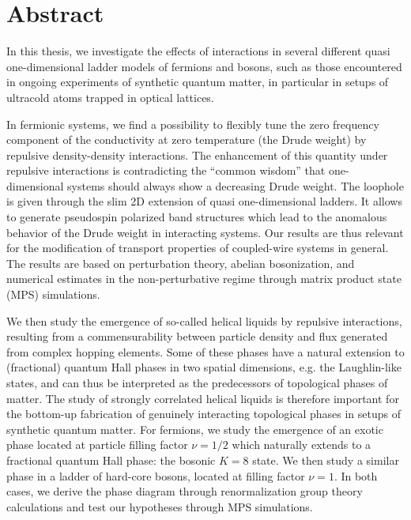 %
\chapter*{Abstract}
%
In this thesis, we investigate the effects of interactions in several different quasi one-dimensional ladder models of fermions and bosons, such as those encountered in ongoing experiments of synthetic quantum matter, in particular in setups of ultracold atoms trapped in optical lattices.

In fermionic systems, we find a possibility to flexibly tune the zero frequency component of the conductivity at zero temperature (the Drude weight) by repulsive density-density interactions.
The enhancement of this quantity under repulsive interactions is contradicting the ``common wisdom'' that one-dimensional systems should always show a decreasing Drude weight.
The loophole is given through the slim 2D extension of quasi one-dimensional ladders.
It allows to generate pseudospin polarized band structures which lead to the anomalous behavior of the Drude weight in interacting systems.
Our results are thus relevant for the modification of transport properties of coupled-wire systems in general.
The results are based on perturbation theory, abelian bosonization, and numerical estimates in the non-perturbative regime through matrix product state (MPS) simulations.

We then study the emergence of so-called helical liquids by repulsive interactions, resulting from a commensurability between particle density and flux generated from complex hopping elements.
Some of these phases have a natural extension to (fractional) quantum Hall phases in two spatial dimensions, e.g. the Laughlin-like states, and can thus be interpreted as the predecessors of topological phases of matter.
The study of strongly correlated helical liquids is therefore important for the bottom-up fabrication of genuinely interacting topological phases in setups of synthetic quantum matter.
For fermions, we study the emergence of an exotic phase located at particle filling factor $\nu=1/2$ which naturally extends to a fractional quantum Hall phase: the bosonic $K=8$ state.
We then study a similar phase in a ladder of hard-core bosons, located at filling factor $\nu=1$.
In both cases, we derive the phase diagram through renormalization group theory calculations and test our hypotheses through MPS simulations.

